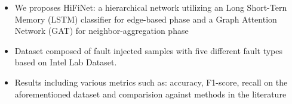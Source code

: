 \begin{itemize}
  \item We proposes HiFiNet: a hierarchical network utilizing an Long Short-Tern Memory (LSTM) classifier for edge-based phase and a Graph Attention
    Network (GAT) for neighbor-aggregation phase
  \item Dataset composed of fault injected samples with five different fault types based on Intel Lab Dataset.
  \item Results including various metrics such as: accuracy, F1-score, recall on the aforementioned dataset and comparision against methods in the
    literature
\end{itemize}
